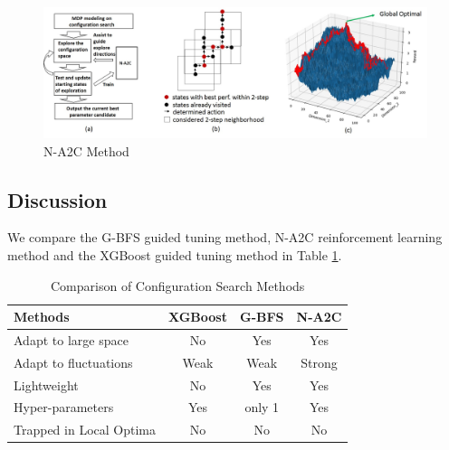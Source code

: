 \begin{figure}
\centering
\includegraphics[scale=0.4]{4_Method/n_a2c_pic.jpg}
\caption{N-A2C Method}
\label{fig:r_a2c}
\end{figure}


\subsection{Discussion}
We compare the G-BFS guided tuning method, N-A2C reinforcement learning method and the XGBoost guided tuning method in Table \ref{tab:compare}.

\begin{table}[h!]
    \small
    \begin{center}
        \caption{Comparison of Configuration Search Methods}
        \label{tab:compare}
        \begin{tabular}{l|c|c|c}
            Methods & XGBoost  & G-BFS & N-A2C \\
            \hline
            Adapt to large space & No & Yes & Yes \\
            Adapt to fluctuations & Weak & Weak & Strong \\
            Lightweight & No & Yes & Yes \\
            Hyper-parameters & Yes & only 1 & Yes \\
            Trapped in Local Optima & No & No & No
        \end{tabular}
    \end{center}
\end{table}

